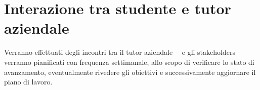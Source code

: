 \section*{Interazione tra studente e tutor aziendale}
Verranno effettuati degli incontri tra il tutor aziendale \nomeTutorAziendale\ \cognomeTutorAziendale\ e gli stakeholders verranno pianificati con frequenza settimanale, allo scopo di verificare lo stato di avanzamento, eventualmente rivedere gli obiettivi e successivamente aggiornare il piano di lavoro.